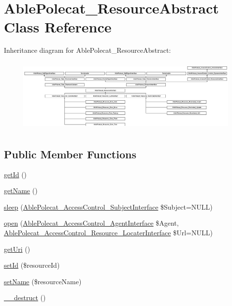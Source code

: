 \hypertarget{class_able_polecat___resource_abstract}{}\section{Able\+Polecat\+\_\+\+Resource\+Abstract Class Reference}
\label{class_able_polecat___resource_abstract}
Inheritance diagram for Able\+Polecat\+\_\+\+Resource\+Abstract\+:\begin{figure}[H]
\begin{center}
\leavevmode
\includegraphics[height=3.756098cm]{class_able_polecat___resource_abstract}
\end{center}
\end{figure}
\subsection*{Public Member Functions}
\begin{DoxyCompactItemize}
\item 
\hyperlink{class_able_polecat___resource_abstract_a12251d0c022e9e21c137a105ff683f13}{get\+Id} ()
\item 
\hyperlink{class_able_polecat___resource_abstract_a3d0963e68bb313b163a73f2803c64600}{get\+Name} ()
\item 
\hyperlink{class_able_polecat___resource_abstract_a365e24d7b066205cafa2a5cce3a4f224}{sleep} (\hyperlink{interface_able_polecat___access_control___subject_interface}{Able\+Polecat\+\_\+\+Access\+Control\+\_\+\+Subject\+Interface} \$Subject=N\+U\+L\+L)
\item 
\hyperlink{class_able_polecat___resource_abstract_aaba20e74dced7f11f018a5a86ead176e}{open} (\hyperlink{interface_able_polecat___access_control___agent_interface}{Able\+Polecat\+\_\+\+Access\+Control\+\_\+\+Agent\+Interface} \$Agent, \hyperlink{interface_able_polecat___access_control___resource___locater_interface}{Able\+Polecat\+\_\+\+Access\+Control\+\_\+\+Resource\+\_\+\+Locater\+Interface} \$Url=N\+U\+L\+L)
\item 
\hyperlink{class_able_polecat___resource_abstract_a2ac86cae38fbe15a019d075d485ab702}{get\+Uri} ()
\item 
\hyperlink{class_able_polecat___resource_abstract_aea086c97a20cf305b4a73485fd11763b}{set\+Id} (\$resource\+Id)
\item 
\hyperlink{class_able_polecat___resource_abstract_a396944828c457deecbba6acb9bee6abf}{set\+Name} (\$resource\+Name)
\item 
\hyperlink{class_able_polecat___resource_abstract_a421831a265621325e1fdd19aace0c758}{\+\_\+\+\_\+destruct} ()
\end{DoxyCompactItemize}
